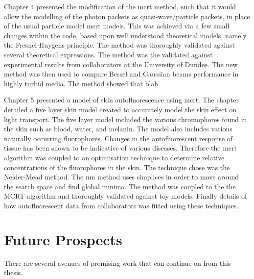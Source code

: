 \medskip

Chapter 4 presented the modification of the \gls*{mcrt} method, such that it would allow the modelling of the photon packets as quasi-wave/particle packets, in place of the usual particle model \gls*{mcrt} models.
This was achieved via a few small changes within the code, based upon well understood theoretical models, namely the Fresnel-Huygens principle.
The method was thoroughly validated against several theoretical expressions.
The method was the validated against experimental results from collaborators at the University of Dundee.
The new method was then used to compare Bessel and Gaussian beams performance in highly turbid media.
The method showed that blah

\medskip

Chapter 5 presented a model of skin autofluorescence using \gls*{mcrt}.
The chapter detailed a five layer skin model created to accurately model the skin effect on light transport.
The five layer model included the various chromophores found in the skin such as blood, water, and melanin.
The model also includes various naturally occurring fluorophores.
Changes in the autofluorescent response of tissue has been shown to be indicative of various diseases.
Therefore the \gls*{mcrt} algorithm was coupled to an optimisation technique to determine relative concentrations of the fluorophores in the skin.
The technique chose was the Nelder-Mead method.
The \gls*{nm} method uses simplices in order to move around the search space and find global minima.
The method was coupled to the the MCRT algorithm and thoroughly validated against toy models.
Finally details of how autofluorescent data from collaborators was fitted using these techniques.

\section{Future Prospects}

There are several avenues of promising work that can continue on from this thesis.


